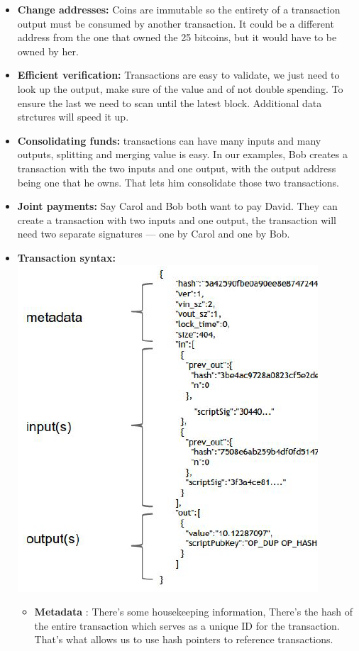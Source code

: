 \documentclass{article}
\begin{document}
\begin{itemize}
\item \textbf{Change addresses:} Coins are immutable so the entirety of a transaction output must be consumed by another transaction. It could be a different address from the one that owned the 25 bitcoins, but it would have to
be owned by her.
\item \textbf{Efficient verification:} Transactions are easy to validate, we just need to look up the output, make sure of the value and of not double spending. To ensure the last we need to scan until the latest block. Additional data strctures will speed it up.
\item \textbf{Consolidating funds:} transactions can have many inputs and many outputs, splitting and merging value is easy. In our examples, Bob creates a transaction with the two inputs and one output, with the output address being one that he owns. That lets him consolidate those two transactions.
\item \textbf{Joint payments:} Say Carol and Bob both want to pay David. They can create a transaction with two inputs and one output, the transaction will need two separate signatures — one by Carol and one by Bob.
\item \textbf{Transaction syntax:}\\
\includegraphics[scale=0.6]{19.png}
\begin{itemize}
\item \textbf{Metadata }: There’s some housekeeping information, There’s the hash of the entire transaction which serves as a unique ID for the transaction. That’s what allows us to use hash pointers to reference transactions.

\end{itemize}
\end{itemize}
\end{document}
